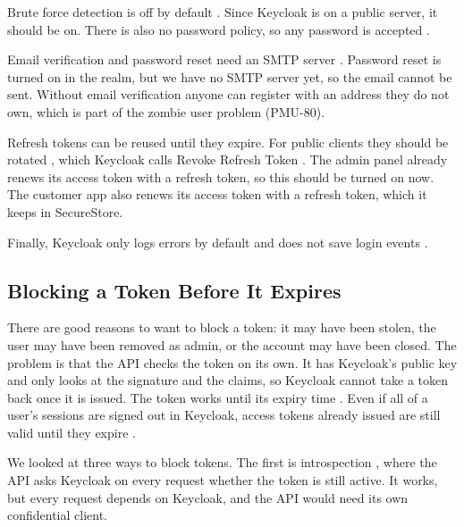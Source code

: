 \documentclass[a4paper,11pt]{article}
\begin{document}
Brute force detection is off by default \cite[sec.~Brute force attacks]{keycloak-server-admin-guide}. Since Keycloak is on a public server, it should be on. There is also no password policy, so any password is accepted \cite[sec.~Password policies]{keycloak-server-admin-guide}.

Email verification and password reset need an SMTP server \cite[sec.~Configuring email for a realm]{keycloak-server-admin-guide}. Password reset is turned on in the realm, but we have no SMTP server yet, so the email cannot be sent. Without email verification anyone can register with an address they do not own, which is part of the zombie user problem (PMU-80).

Refresh tokens can be reused until they expire. For public clients they should be rotated \cite[sec.~2.2.2]{ietf-rfc9700-oauth-security-bcp}, which Keycloak calls Revoke Refresh Token \cite[sec.~Session and token timeouts]{keycloak-server-admin-guide}. The admin panel already renews its access token with a refresh token, so this should be turned on now. The customer app also renews its access token with a refresh token, which it keeps in SecureStore.

Finally, Keycloak only logs errors by default and does not save login events \cite[sec.~Auditing user events]{keycloak-server-admin-guide}.

\subsection{Blocking a Token Before It Expires}
\label{sec:block-token}
There are good reasons to want to block a token: it may have been stolen, the user may have been removed as admin, or the account may have been closed. The problem is that the API checks the token on its own. It has Keycloak's public key and only looks at the signature and the claims, so Keycloak cannot take a token back once it is issued. The token works until its expiry time \cite[sec.~4.1.4]{ietf-rfc7519-jwt}. Even if all of a user's sessions are signed out in Keycloak, access tokens already issued are still valid until they expire \cite[sec.~Signing out all active sessions]{keycloak-server-admin-guide}.

We looked at three ways to block tokens. The first is introspection \cite{ietf-rfc7662-token-introspection}, where the API asks Keycloak on every request whether the token is still active. It works, but every request depends on Keycloak, and the API would need its own confidential client.
\end{document}
